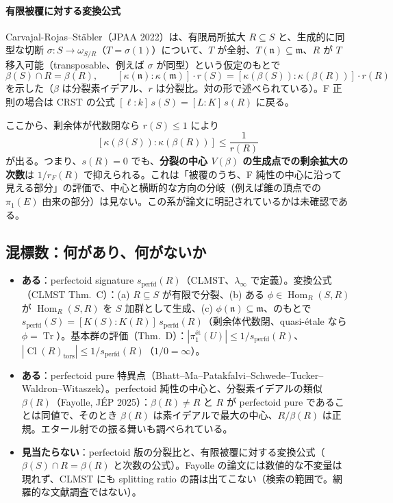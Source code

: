 \documentclass[11pt,a4paper]{ltjsarticle}
\theoremstyle{plain}
\theoremstyle{definition}
\theoremstyle{remark}
\theoremstyle{plain}
\newcommand{\m}{\mathfrak{m}}
\newcommand{\n}{\mathfrak{n}}
\newcommand{\Hom}{\operatorname{Hom}}
\newcommand{\Tr}{\operatorname{Tr}}
\newcommand{\Cl}{\operatorname{Cl}}
\begin{document}
\paragraph{有限被覆に対する変換公式}
Carvajal-Rojas--Stäbler（JPAA 2022）は、有限局所拡大 $R\subseteq S$ と、生成的に同型な切断 $\sigma\colon S\to\omega_{S/R}$（$T = \sigma(1)$）について、$T$ が全射、$T(\n)\subseteq\m$、$R$ が $T$ 移入可能（transposable、例えば $\sigma$ が同型）という仮定のもとで
\[
  \beta(S)\cap R = \beta(R),\qquad
  [\kappa(\n):\kappa(\m)]\cdot r(S) = [\kappa(\beta(S)):\kappa(\beta(R))]\cdot r(R)
\]
を示した（$\beta$ は分裂素イデアル、$r$ は分裂比。対の形で述べられている）。F 正則の場合は CRST の公式 $[\ell:k]\,s(S) = [L:K]\,s(R)$ に戻る。

ここから、剰余体が代数閉なら $r(S)\le1$ により
\[
  [\kappa(\beta(S)):\kappa(\beta(R))]\le\frac{1}{r(R)}
\]
が出る。つまり、$s(R) = 0$ でも、\textbf{分裂の中心 $V(\beta)$ の生成点での剰余拡大の次数}は $1/r_F(R)$ で抑えられる。これは「被覆のうち、F 純性の中心に沿って見える部分」の評価で、中心と横断的な方向の分岐（例えば錐の頂点での $\pi_1(E)$ 由来の部分）は見ない。この系が論文に明記されているかは未確認である。

\subsection{混標数：何があり、何がないか}
\begin{itemize}
  \item \textbf{ある}：perfectoid signature $s_{\mathrm{perfd}}(R)$（CLMST、$\lambda_\infty$ で定義）。変換公式（CLMST Thm.~C）：(a) $R\subseteq S$ が有限で分裂、(b) ある $\phi\in\Hom_R(S,R)$ が $\Hom_R(S,R)$ を $S$ 加群として生成、(c) $\phi(\n)\subseteq\m$、のもとで $s_{\mathrm{perfd}}(S) = [K(S):K(R)]\,s_{\mathrm{perfd}}(R)$（剰余体代数閉、quasi-étale なら $\phi = \Tr$）。基本群の評価（Thm.~D）：$|\pi_1^{\text{ét}}(U)|\le 1/s_{\mathrm{perfd}}(R)$、$|\Cl(R)_{\mathrm{tors}}|\le 1/s_{\mathrm{perfd}}(R)$（$1/0 = \infty$）。
  \item \textbf{ある}：perfectoid pure 特異点（Bhatt--Ma--Patakfalvi--Schwede--Tucker--Waldron--Witaszek）。perfectoid 純性の中心と、分裂素イデアルの類似 $\beta(R)$（Fayolle, JÉP 2025）：$\beta(R)\neq R$ と $R$ が perfectoid pure であることは同値で、そのとき $\beta(R)$ は素イデアルで最大の中心、$R/\beta(R)$ は正規。エタール射での振る舞いも調べられている。
  \item \textbf{見当たらない}：perfectoid 版の分裂比と、有限被覆に対する変換公式（$\beta(S)\cap R = \beta(R)$ と次数の公式）。Fayolle の論文には数値的な不変量は現れず、CLMST にも splitting ratio の語は出てこない（検索の範囲で。網羅的な文献調査ではない）。
\end{itemize}
\end{document}
